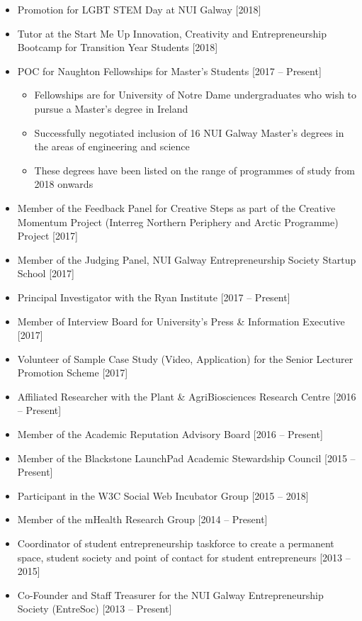 \documentclass[10pt,a4paper]{res} %
\begin{document}
\begin{resume}
\begin{itemize} \itemsep -2pt
\item Promotion for LGBT STEM Day at NUI Galway [2018]
\item Tutor at the Start Me Up Innovation, Creativity and Entrepreneurship Bootcamp for Transition Year Students [2018]
\item POC for Naughton Fellowships for Master's Students [2017 -- Present]
\begin{itemize} \itemsep -2pt
\item Fellowships are for University of Notre Dame undergraduates who wish to pursue a Master's degree in Ireland
\item Successfully negotiated inclusion of 16 NUI Galway Master's degrees in the areas of engineering and science
\item These degrees have been listed on the range of programmes of study from 2018 onwards
\end{itemize}
\item Member of the Feedback Panel for Creative Steps as part of the Creative Momentum Project (Interreg Northern Periphery and Arctic Programme) Project [2017]
\item Member of the Judging Panel, NUI Galway Entrepreneurship Society Startup School [2017]
\item Principal Investigator with the Ryan Institute [2017 -- Present]
\item Member of Interview Board for University's Press \& Information Executive [2017]
\item Volunteer of Sample Case Study (Video, Application) for the Senior Lecturer Promotion Scheme [2017]
\item Affiliated Researcher with the Plant \& AgriBiosciences Research Centre [2016 -- Present]
\item Member of the Academic Reputation Advisory Board [2016 -- Present]
\item Member of the Blackstone LaunchPad Academic Stewardship Council [2015 -- Present]
\item Participant in the W3C Social Web Incubator Group [2015 -- 2018]
\item Member of the mHealth Research Group [2014 -- Present]
\item Coordinator of student entrepreneurship taskforce to create a permanent space, student society and point of contact for student entrepreneurs [2013 -- 2015]
\item Co-Founder and Staff Treasurer for the NUI Galway Entrepreneurship Society (EntreSoc) [2013 -- Present]

\end{itemize}
\end{resume}
\end{document}
